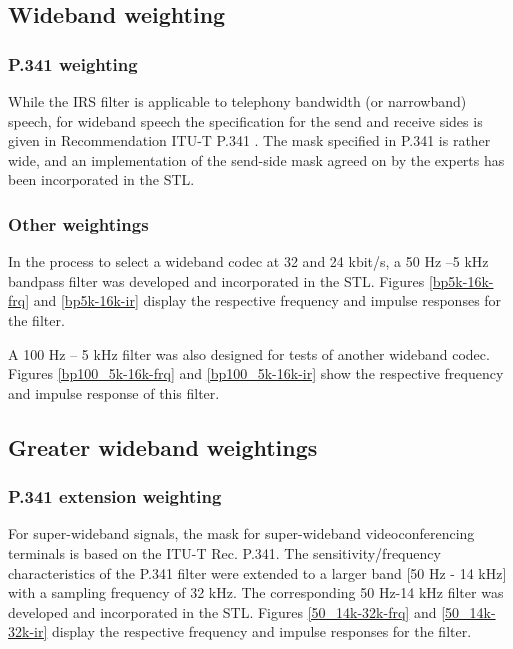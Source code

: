 
\subsection{Wideband weighting}
\subsubsection{P.341 weighting}

While the IRS filter is applicable to telephony bandwidth (or
narrowband) speech, for wideband speech the specification for the send
and receive sides is given in Recommendation ITU-T P.341
\cite{P.341}. The mask specified in P.341 is rather wide, and an
implementation of the send-side mask agreed on by the experts has been
incorporated in the STL.

\subsubsection{Other weightings}

In the process to select a wideband codec at 32 and 24 kbit/s, a
50 Hz --5 kHz bandpass filter was developed and incorporated in the
STL. Figures \ref{bp5k-16k-frq} and \ref{bp5k-16k-ir} display the
respective frequency and impulse responses for the filter. 

A 100 Hz -- 5 kHz filter was also designed for tests of another wideband
codec. Figures \ref{bp100_5k-16k-frq} and \ref{bp100_5k-16k-ir} show
the respective frequency and impulse response of this filter.

\subsection{Greater wideband weightings}

\subsubsection{P.341 extension weighting}
For super-wideband signals, the mask for super-wideband
videoconferencing terminals is based on the ITU-T Rec. P.341. The
sensitivity/frequency characteristics of the P.341 filter were
extended to a larger band [50 Hz - 14 kHz] with a sampling frequency
of 32 kHz.  The corresponding 50 Hz-14 kHz filter was developed and
incorporated in the STL. Figures \ref{50_14k-32k-frq} and
\ref{50_14k-32k-ir} display the respective frequency and impulse
responses for the filter.


